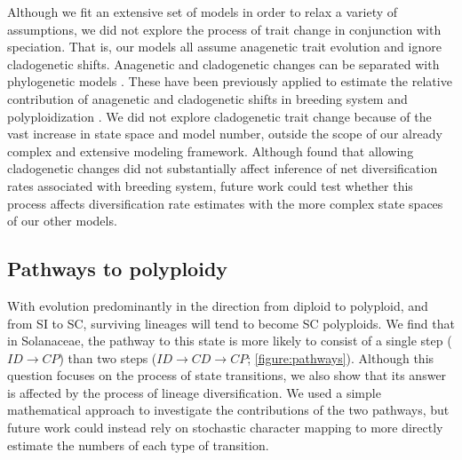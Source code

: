  
Although we fit an extensive set of models in order to relax a variety of assumptions, we did not explore the process of trait change in conjunction with speciation.
That is, our models all assume anagenetic trait evolution and ignore cladogenetic shifts.
Anagenetic and cladogenetic changes can be separated with phylogenetic models \citep{mayrose_2011, goldberg_2012, magnuson-ford_2012}. 
These have been previously applied to estimate the relative contribution of anagenetic and cladogenetic shifts in breeding system \citep{goldberg_2012} and polyploidization \citep{zhan_2016, freyman_2017}.
We did not explore cladogenetic trait change because of the vast increase in state space and model number, outside the scope of our already complex and extensive modeling framework. 
Although \citet{goldberg_2012} found that allowing cladogenetic changes did not substantially affect inference of net diversification rates associated with breeding system, future work could test whether this process affects diversification rate estimates with the more complex state spaces of our other models.

\subsection{Pathways to polyploidy}

With evolution predominantly in the direction from diploid to polyploid, and from SI to SC, surviving lineages will tend to become SC polyploids.
We find that in Solanaceae, the pathway to this state is more likely to consist of a single step ($ID \rightarrow CP$) than two steps ($ID \rightarrow CD \rightarrow CP$; \cref{figure:pathways}).
Although this question focuses on the process of state transitions, we also show that its answer is affected by the process of lineage diversification.
We used a simple mathematical approach to investigate the contributions of the two pathways, but future work could instead rely on stochastic character mapping to more directly estimate the numbers of each type of transition.


